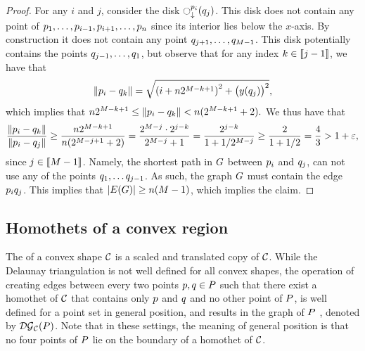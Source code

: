 \documentclass[12pt]{article}%
\begin{document}
\begin{proof}
    For any $i$ and $j$, consider the disk
    $\diskVY{\pa_i}{\pb_j}$. This disk does not contain any point of
    $p_1,\ldots, p_{i-1}, p_{i+1}, \ldots, p_{n}$ since its
    interior lies below the $x$-axis. By construction it does not
    contain any point $q_{j+1}, \ldots, q_{M-1}$. This disk
    potentially contains the points $q_{j-1}, \ldots, q_1$, but
    observe that for any index $k \in \IRX{j-1}$, we have that
    \begin{equation*}
        \dY{\pa_i}{\pb_k} %
        =%
        \sqrt{ \pth{i + n 2^{M-k+1} }^2 + \bigl( y(\pb_j) \bigr)^2 },
    \end{equation*}
    which implies that
    \begin{math}
        n 2^{M-k+1}%
        \leq%
        \dY{\pa_i}{\pb_k} %
        <%
        n( 2^{M-k+1} +2).
    \end{math}
    We thus have that
    \begin{equation*}
        \frac{\dY{\pa_i}{\pb_k}}{\dY{\pa_i}{\pb_j}}
        \geq%
        \frac{n 2^{M-k+1}}{n( 2^{M-j+1} +2)}
        =%
        \frac{ 2^{M-j}\cdot 2^{j-k}}{ 2^{M-j} +1}
        =%
        \frac{  2^{j-k}}{ 1 + 1/2^{M-j}}
        \geq
        \frac{2}{1+1/2}
        = \frac{4}{3}
        > 1+\eps,
    \end{equation*}
    since $j \in \IRX{M-1}$.  Namely, the shortest path in $G$
    between $p_i$ and $q_j$, can not use any of the points
    $q_{1}, \ldots q_{j-1}$. As such, the graph $G$ must contain
    the edge $p_i q_j$. This implies that
    $|\EGX{\G}| \geq n (M-1)$, which implies the claim.
\end{proof}






\subsection{Homothets of a convex region}

\HERE

The  of a convex shape $\mathcal{C}$ is a scaled and
translated copy of $\mathcal{C}$.  While the Delaunay triangulation is not
well defined for all convex shapes, the operation of creating edges
between every two points $p,q\in P$ such that there exist a
homothet of $\mathcal{C}$ that contains only $p$ and $q$ and no other
point of $P$, is well defined for a point set in general position,
and results in the  graph of $P$
\cite{cd-vdbcdf-85}, denoted by $\mathcal{DG}_{\mathcal{C}}(P)$.  Note that in these
settings, the meaning of general position is that no four points of
$P$ lie on the boundary of a homothet of $\mathcal{C}$.
\end{document}
